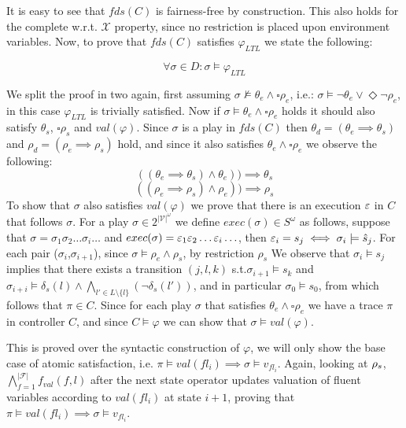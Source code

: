 It is easy to see that $fds(C)$ is fairness-free by construction. This also holds for the complete w.r.t. $\mathcal{X}$ property, since no restriction is placed upon environment variables. Now, to prove that $fds(C)$ satisfies $\varphi_{LTL}$ we state the following:

\[\forall \sigma \in D: \sigma \models \varphi_{LTL} \]

We split the proof in two again, first assuming $\sigma \not\models \theta_e \wedge \square \rho_e$, i.e.: $\sigma \models \neg\theta_e \vee \Diamond \neg\rho_e$, in this case $\varphi_{LTL}$ is trivially satisfied. Now if $\sigma \models \theta_e \wedge \square \rho_e$ holds it should also satisfy $\theta_s$, $\square\rho_s$ and $val(\varphi)$. Since $\sigma$ is a play in $fds(C)$ then $\theta_d=(\theta_e \implies \theta_s)$ and $\rho_d=(\rho_e \implies \rho_s)$ hold, and since it also satisfies $\theta_e \wedge \square \rho_e$ we observe the following:
\[((\theta_e \implies \theta_s) \wedge \theta_e))\implies \theta_s\]
\[((\rho_e \implies \rho_s) \wedge \rho_e))\implies \rho_s\]
To show that $\sigma$ also satisfies $val(\varphi)$ we prove that there is an execution $\varepsilon$ in $C$ that follows $\sigma$.
For a play $\sigma \in 2^{|\mathcal{V}|^{\omega}}$ we define $exec(\sigma) \in S^{\omega}$ as follows, suppose that $\sigma = \sigma_1 \sigma_2 \ldots \sigma_i \ldots$ and
$exec(\sigma)= \varepsilon_1 \varepsilon_2 \ldots \varepsilon_i \ldots$, then $\varepsilon_i = s_j \iff \sigma_i \models \hat{s}_{j}$. For each pair ($\sigma_i$,$\sigma_{i+1}$), since $\sigma \models \rho_e \wedge \rho_s$, by restriction $\rho_s$
We observe that $\sigma_i \models s_j$ implies that there exists a transition $(j, l, k)$ s.t.$\sigma_{i+1} \models s_k$ and $\sigma_{i+i} \models \delta_s(l) \wedge \bigwedge_{l' \in L \setminus \{l\}}(\neg \delta_s(l'))$, and in particular $\sigma_0 \models s_0$, from which follows that $\pi \in C$.
Since for each play $\sigma$ that satisfies $\theta_e \wedge \square \rho_e$ we have a trace $\pi$ in controller $C$, and since $C \models \varphi$ we can show that $\sigma \models val(\varphi)$.


This is proved over the syntactic construction of $\varphi$, we will only show the base case of atomic satisfaction, i.e.
$\pi \models val(fl_i) \implies \sigma \models v_{fl_i}$. Again, looking at ${\rho_s}$, $\bigwedge_{f = 1}^{|\mathcal{F}|}f_{val}(f,l)$ after the next state operator updates valuation of fluent variables according to $val(fl_i)$ at state $i+1$, proving that $\pi \models val(fl_i) \implies \sigma \models v_{fl_i}$.


